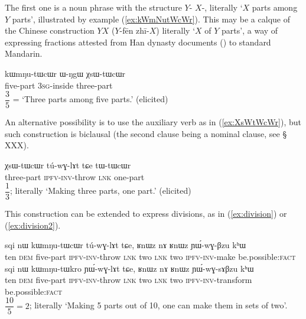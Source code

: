 The first one is a noun phrase with the structure $Y$-  $X$-, literally `$X$ parts among $Y$ parts', illustrated by example (\ref{ex:kWmNutWcWr}). This may be a calque of the Chinese construction $Y$$X$ 
($Y$-fēn zhī-$X$) literally `$X$ of $Y$ parts', a way of expressing fractions attested from Han dynasty documents (\citealt{anicotte15fractions}) to standard Mandarin.
 
\begin{exe}
\ex \label{ex:kWmNutWcWr}
\gll kɯmŋu-tɯcɯr ɯ-ŋgɯ χsɯ-tɯcɯr  \\
 five-part \textsc{3sg}-inside three-part \\
\glt $\dfrac{3}{5}$ = `Three parts among five parts.' (elicited)
\end{exe}

An alternative possibility is to use the auxiliary verb  as in (\ref{ex:XsWtWcWr}), but such construction is biclausal (the second clause being a nominal clause, see § XXX).

\begin{exe}
\ex \label{ex:XsWtWcWr}
\gll χsɯ-tɯcɯr tú-wɣ-lɤt tɕe tɯ-tɯcɯr   \\
 three-part \textsc{ipfv}-\textsc{inv}-throw \textsc{lnk} one-part \\
\glt $\dfrac{1}{3}$; literally `Making three parts, one part.' (elicited)
\end{exe}

This construction can be  extended to express divisions, as in (\ref{ex:division}) or (\ref{ex:division2}).

\begin{exe}
\ex \label{ex:division}
\gll sqi nɯ kɯmŋu-tɯcɯr tú-wɣ-lɤt tɕe, ʁnɯz nɤ ʁnɯz ɲɯ́-wɣ-βzu kʰɯ \\
 ten \textsc{dem} five-part \textsc{ipfv}-\textsc{inv}-throw \textsc{lnk} two \textsc{lnk} two \textsc{ipfv}-\textsc{inv}-make be.possible:\textsc{fact} \\
 \ex \label{ex:division2}
\gll sqi nɯ kɯmŋu-tɯkro ɲɯ́-wɣ-lɤt tɕe, ʁnɯz nɤ ʁnɯz ɲɯ́-wɣ-sɤβzu kʰɯ \\
 ten \textsc{dem} five-part \textsc{ipfv}-\textsc{inv}-throw \textsc{lnk} two \textsc{lnk} two \textsc{ipfv}-\textsc{inv}-transform be.possible:\textsc{fact} \\
\glt $\dfrac{10}{5}=2$; literally `Making 5 parts out of 10, one can make them in sets of two'.
\end{exe}

 
